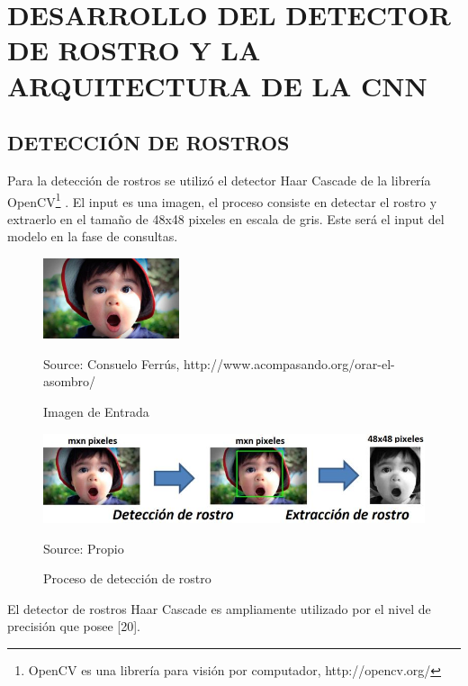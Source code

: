 \chapter{DESARROLLO DEL DETECTOR DE ROSTRO Y LA
ARQUITECTURA DE LA CNN}

\section{DETECCIÓN DE ROSTROS}
Para la detección de rostros se utilizó el detector Haar Cascade de la librería
OpenCV\footnote[7]{OpenCV es una librería para visión por computador, http://opencv.org/} . El input es una imagen, el proceso consiste en detectar el rostro y extraerlo en
el tamaño de 48x48 pixeles en escala de gris. Este será el input del modelo en la fase de
consultas.

\begin{figure}[H]
		\centering
		\includegraphics[width=40mm]{./Imagenes/imagen_entrada.png}
		\caption{Imagen de Entrada}
		Source: Consuelo Ferrús, http://www.acompasando.org/orar-el-asombro/
		\label{fig:imagen_entrada}
\end{figure}


\begin{figure}[H]
		\centering
		\includegraphics[width=120mm]{./Imagenes/proceso_deteccion.png}
		\caption{Proceso de detección de rostro}
		Source: Propio
		\label{fig:proceso_deteccion}
\end{figure}

El detector de rostros Haar Cascade es ampliamente utilizado por el nivel de
precisión que posee [20].

